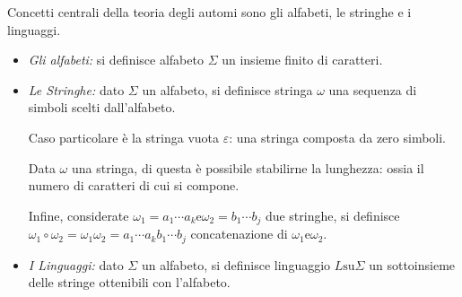 \documentclass{subfiles}
\begin{document}
Concetti  centrali della teoria degli automi sono gli alfabeti, le stringhe e i linguaggi.
\begin{itemize}
    \item \emph{Gli alfabeti:}
          si definisce alfabeto \(\Sigma\) un insieme finito di caratteri.

    \item \emph{Le Stringhe:}
          dato \(\Sigma\) un alfabeto, si definisce stringa \(\omega\) una sequenza di simboli scelti dall'alfabeto.

          Caso particolare è la stringa vuota \(\varepsilon\): una stringa composta da zero simboli.


          Data \(\omega\) una stringa, di questa è possibile stabilirne la lunghezza: ossia il numero di caratteri di cui si compone.

          Infine, considerate \(\omega_{1} = a_{1} \cdots a_{k} \text{e} \omega_{2} = b_{1} \cdots b_{j}\) due stringhe,
          si definisce \(\omega_{1} \circ \omega_{2} = \omega_{1}\omega_{2}=  a_{1} \cdots a_{k} b_{1} \cdots b_{j}\) concatenazione di \(\omega_{1} \text{e} \omega_{2}\).

    \item \emph{I Linguaggi:} dato \(\Sigma\) un alfabeto, si definisce linguaggio \(L \text{su} \Sigma\) un sottoinsieme delle stringe ottenibili con l'alfabeto.
\end{itemize}
\end{document}

